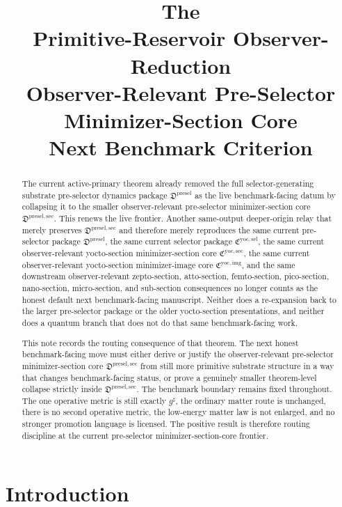 \documentclass[11pt]{article}
\title{\textbf{The \TheoryName{}}\\[0.4em]
\large Primitive-Reservoir Observer-Reduction\\
\large Observer-Relevant Pre-Selector Minimizer-Section Core\\
\large Next Benchmark Criterion}
\author{}
\date{}
\newcommand{\CompletedMetric}{g^{\sharp}}
\newcommand{\PreSelectorPackage}{\mathfrak D^{\mathrm{presel}}}
\newcommand{\PreSelectorMinSectionCore}{\mathfrak D^{\mathrm{presel,sec}}}
\newcommand{\YoctoSelectorPackage}{\mathfrak C^{\mathrm{yoc,sel}}}
\newcommand{\YoctoImageCore}{\mathfrak C^{\mathrm{yoc,img}}}
\newcommand{\YoctoMinSectionCore}{\mathfrak C^{\mathrm{yoc,sec}}}
\begin{document}
\maketitle

\begin{abstract}
The current active-primary theorem already removed the full selector-generating substrate pre-selector dynamics package \(\PreSelectorPackage\) as the live benchmark-facing datum by collapsing it to the smaller observer-relevant pre-selector minimizer-section core \(\PreSelectorMinSectionCore\). This renews the live frontier. Another same-output deeper-origin relay that merely preserves \(\PreSelectorMinSectionCore\) and therefore merely reproduces the same current pre-selector package \(\PreSelectorPackage\), the same current selector package \(\YoctoSelectorPackage\), the same current observer-relevant yocto-section minimizer-section core \(\YoctoMinSectionCore\), the same current observer-relevant yocto-section minimizer-image core \(\YoctoImageCore\), and the same downstream observer-relevant zepto-section, atto-section, femto-section, pico-section, nano-section, micro-section, and sub-section consequences no longer counts as the honest default next benchmark-facing manuscript. Neither does a re-expansion back to the larger pre-selector package or the older yocto-section presentations, and neither does a quantum branch that does not do that same benchmark-facing work.

This note records the routing consequence of that theorem. The next honest benchmark-facing move must either derive or justify the observer-relevant pre-selector minimizer-section core \(\PreSelectorMinSectionCore\) from still more primitive substrate structure in a way that changes benchmark-facing status, or prove a genuinely smaller theorem-level collapse strictly inside \(\PreSelectorMinSectionCore\). The benchmark boundary remains fixed throughout. The one operative metric is still exactly \(\CompletedMetric\), the ordinary matter route is unchanged, there is no second operative metric, the low-energy matter law is not enlarged, and no stronger promotion language is licensed. The positive result is therefore routing discipline at the current pre-selector minimizer-section-core frontier.
\end{abstract}

\section{Introduction}
\end{document}
